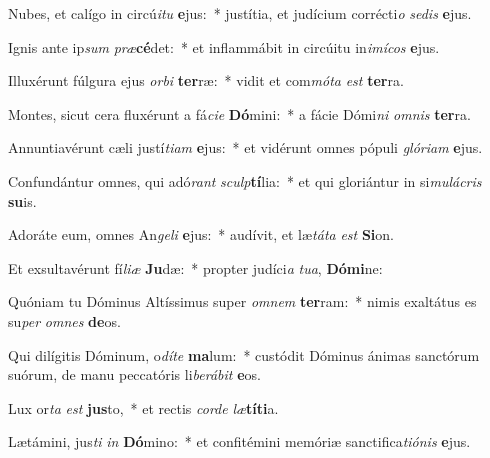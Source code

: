 \item Nubes, et calígo in circú\textit{i}\textit{tu} \textbf{e}jus:~* justítia, et judícium corrécti\textit{o} \textit{se}\textit{dis} \textbf{e}jus.
\item Ignis ante ip\textit{sum} \textit{præ}\textbf{cé}det:~* et inflammábit in circúitu in\textit{i}\textit{mí}\textit{cos} \textbf{e}jus.
\item Illuxérunt fúlgura ejus \textit{or}\textit{bi} \textbf{ter}ræ:~* vidit et com\textit{mó}\textit{ta} \textit{est} \textbf{ter}ra.
\item Montes, sicut cera fluxérunt a fá\textit{ci}\textit{e} \textbf{Dó}mini:~* a fácie Dómi\textit{ni} \textit{om}\textit{nis} \textbf{ter}ra.
\item Annuntiavérunt cæli justí\textit{ti}\textit{am} \textbf{e}jus:~* et vidérunt omnes pópuli \textit{gló}\textit{ri}\textit{am} \textbf{e}jus.
\item Confundántur omnes, qui adó\textit{rant} \textit{sculp}\textbf{tí}lia:~* et qui gloriántur in si\textit{mu}\textit{lá}\textit{cris} \textbf{su}is.
\item Adoráte eum, omnes An\textit{ge}\textit{li} \textbf{e}jus:~* audívit, et læ\textit{tá}\textit{ta} \textit{est} \textbf{Si}on.
\item Et exsultavérunt fí\textit{li}\textit{æ} \textbf{Ju}dæ:~* propter judíci\textit{a} \textit{tu}\textit{a}, \textbf{Dó}\textbf{mi}ne:
\item Quóniam tu Dóminus Altíssimus super \textit{om}\textit{nem} \textbf{ter}ram:~* nimis exaltátus es su\textit{per} \textit{om}\textit{nes} \textbf{de}os.
\item Qui dilígitis Dóminum, o\textit{dí}\textit{te} \textbf{ma}lum:~* custódit Dóminus ánimas sanctórum suórum, de manu peccatóris li\textit{be}\textit{rá}\textit{bit} \textbf{e}os.
\item Lux or\textit{ta} \textit{est} \textbf{jus}to,~* et rectis \textit{cor}\textit{de} \textit{læ}\textbf{tí}\textbf{ti}a.
\item Lætámini, jus\textit{ti} \textit{in} \textbf{Dó}mino:~* et confitémini memóriæ sanctifica\textit{ti}\textit{ó}\textit{nis} \textbf{e}jus.
